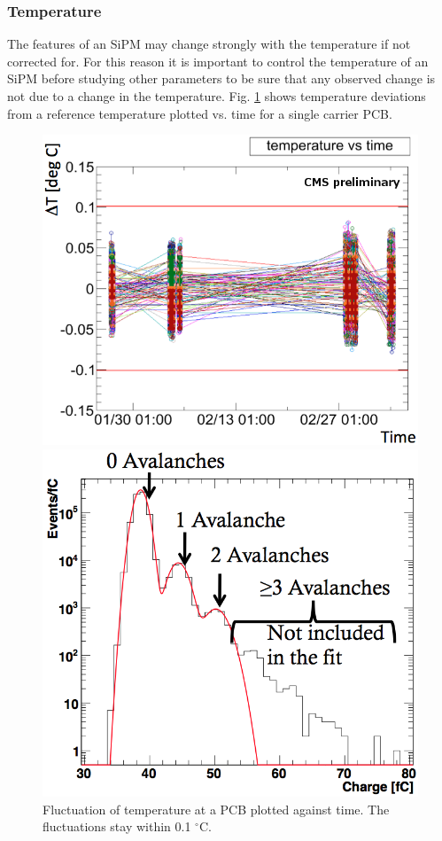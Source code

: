 \subsubsection{Temperature}
The features of an SiPM may change strongly with the temperature if not corrected for. For this reason it is important to control the temperature of an SiPM before studying other parameters to be sure that any observed change is not due to a change in the temperature. Fig. \ref{temperatureStability} shows  temperature deviations from a reference temperature plotted vs. time for a single carrier PCB.
\begin{figure}[h]
\centering
\begin{minipage}[t]{0.475\textwidth}
\includegraphics[width=\textwidth]{Bilder/temperature.png}
\caption{Fluctuation of temperature at a PCB plotted against time. The fluctuations stay within 0.1 $^\circ$C.}
\label{temperatureStability}
\end{minipage}
\hspace{0.5cm}
\begin{minipage}[t]{0.455\textwidth}
\includegraphics[width=\textwidth]{Bilder/gainDetermination.png}

\end{minipage}
\end{figure}
